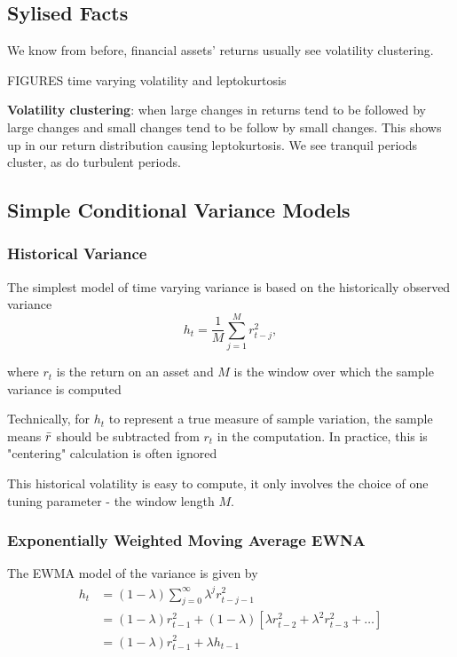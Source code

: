 \documentclass[11pt]{article}
\begin{document}
\subsection{Sylised Facts}

We know from before, financial assets' returns usually see volatility clustering.

FIGURES time varying volatility and leptokurtosis

\begin{definition}
\textbf{Volatility clustering}: when large changes in returns tend to be followed by large changes and small changes tend to be follow by small changes. This shows up in our return distribution causing leptokurtosis. We see tranquil periods cluster, as do turbulent periods.
\end{definition}

\subsection{Simple Conditional Variance Models}

\subsubsection{Historical Variance}

The simplest model of time varying variance is based on the historically observed variance
\[h_t = \dfrac{1}{M}\sum_{j=1}^M r_{t-j}^2,\]

where $r_t$ is the return on an asset and $M$ is the window over which the sample variance is computed
\begin{note}

Technically, for $h_t$ to represent a true measure of sample variation, the sample means $\Bar{r}$ should be subtracted from $r_t$ in the computation. In practice, this is "centering" calculation is often ignored
\end{note}

This historical volatility is easy to compute, it only involves the choice of one tuning parameter - the window length $M$.

\subsubsection{Exponentially Weighted Moving Average EWNA}

The EWMA model of the variance is given by
\begin{equation}
\begin{aligned}
h_t &= (1-\lambda)\sum_{j=0}^\infty \lambda^j r_{t-j-1}^2 \\
&= (1-\lambda) r_{t-1}^2 + (1-\lambda)\left[\lambda r_{t-2}^2 + \lambda^2 r_{t-3}^2 + \ldots\right] \\
&= (1-\lambda) r_{t-1}^2 + \lambda h_{t-1}
\end{aligned}
\end{equation}
\end{document}
